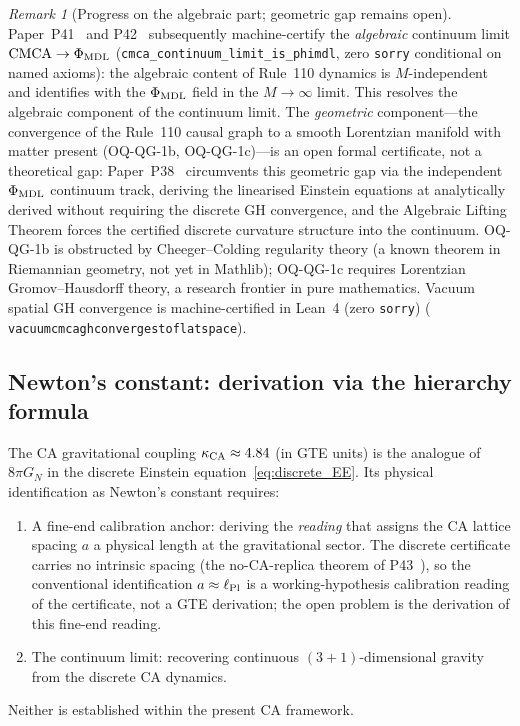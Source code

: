 \documentclass[11pt]{article}
\theoremstyle{remark}
\newtheorem{remark}[theorem]{Remark}
\newcommand{\lean}[1]{%
  \penalty-100
  \begingroup\def\_{\textunderscore\allowbreak}\texttt{#1}\endgroup}
\newcommand{\CatAL}{machine-certified in Lean~4 (zero \texttt{sorry})}
\newcommand{\CatAD}{analytically derived}
\newcommand{\kCA}{\kappa_{\rm CA}}
\begin{document}
\begin{remark}[Progress on the algebraic part; geometric gap remains open]
\label{rem:continuum_partial}
Paper~P41~\cite{SpivackCMCA} and P42~\cite{SpivackPhiMDLField}
subsequently machine-certify the \emph{algebraic} continuum limit
$\mathrm{CMCA}\to\Phi_{\rm MDL}$ (\texttt{cmca\_continuum\_limit\_is\_phimdl},
zero \texttt{sorry} conditional on named axioms):
the algebraic content of Rule~110 dynamics is $M$-independent and
identifies with the $\Phi_{\rm MDL}$ field in the $M\to\infty$ limit.
This resolves the algebraic component of the continuum limit.
The \emph{geometric} component---the convergence of the Rule~110 causal
graph to a smooth Lorentzian manifold with matter present (OQ-QG-1b,
OQ-QG-1c)---is an open formal certificate, not a theoretical gap:
Paper~P38~\cite{SpivackPhiMDLGravity} circumvents this geometric gap via the
independent $\Phi_{\rm MDL}$ continuum track, deriving the linearised
Einstein equations at \CatAD{} without requiring the discrete GH convergence,
and the Algebraic Lifting Theorem forces the certified discrete curvature
structure into the continuum.  OQ-QG-1b is obstructed by Cheeger--Colding
regularity theory (a known theorem in Riemannian geometry, not yet in Mathlib);
OQ-QG-1c requires Lorentzian Gromov--Hausdorff theory, a research frontier in
pure mathematics.  Vacuum spatial GH convergence is \CatAL{}
(\lean{vacuum\_cmca\_gh\_converges\_to\_flat\_space}).
\end{remark}

\subsection{Newton's constant: derivation via the hierarchy formula}
\label{ssec:gnewton}

The CA gravitational coupling $\kCA \approx 4.84$ (in GTE units) is the
analogue of $8\pi G_N$ in the discrete Einstein
equation~\eqref{eq:discrete_EE}.
Its physical identification as Newton's constant requires:
\begin{enumerate}[leftmargin=2em]
\item A fine-end calibration anchor: deriving the \emph{reading} that
assigns the CA lattice spacing $a$ a physical length at the gravitational
sector.  The discrete certificate carries no intrinsic spacing (the
no-CA-replica theorem of P43~\cite{SpivackCompleteness}), so the
conventional identification $a \approx \ell_{\rm Pl}$ is a
working-hypothesis calibration reading of the certificate, not a GTE
derivation; the open problem is the derivation of this fine-end reading.
\item The continuum limit: recovering continuous $(3+1)$-dimensional gravity
from the discrete CA dynamics.
\end{enumerate}
Neither is established within the present CA framework.
\end{document}
